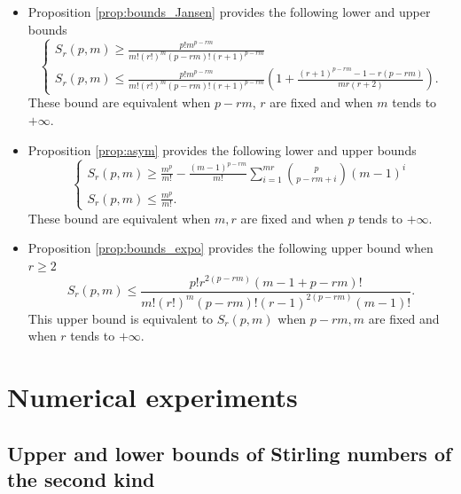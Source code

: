 \documentclass{article}
\theoremstyle{plain}
\begin{document}
\begin{itemize}
\item Proposition \ref{prop:bounds_Jansen} provides the following lower and upper bounds
\begin{equation}
\begin{cases}
   S_r(p,m) \ge \frac{p!m^{p-rm}}{m!(r!)^m(p-rm)!(r+1)^{p-rm}}\\
  S_r(p,m) \le \frac{p!m^{p-rm}}{m!(r!)^m(p-rm)!(r+1)^{p-rm}}\left(1+\frac{(r+1)^{p-rm}-1-r(p-rm)}{mr(r+2)} \right).
\end{cases}
\end{equation}
These bound are equivalent when $p-rm$, $r$ are fixed and when $m$ tends to $+\infty$. 
\item Proposition \ref{prop:asym} provides the following lower and upper bounds
\begin{equation}
\begin{cases}
   S_r(p,m) \ge \frac{m^p}{m!} - \frac{(m-1)^{p-rm}}{m!}\sum_{i=1}^{mr} \binom{p}{p-rm+i}(m-1)^{i}\\
  S_r(p,m) \le \frac{m^p}{m!}.
\end{cases}
\end{equation}
These bound are equivalent when $m, r$ are fixed and when $p$ tends to $+\infty$. 
 \item Proposition \ref{prop:bounds_expo} provides the following  upper bound when $r\ge 2$
\begin{equation}
S_r(p,m)\le \frac{p!r^{2(p-rm)}(m-1+p-rm)!}{m!(r!)^m(p-rm)!(r-1)^{2(p-rm)}(m-1)!}.
\end{equation}
This upper bound is equivalent to $S_r(p,m)$ when $p-rm, m$ are fixed and when $r$ 
tends to $+\infty$. 
\end{itemize}


\section{Numerical experiments}
\subsection{Upper and lower bounds of Stirling numbers of the second kind}
\end{document}
